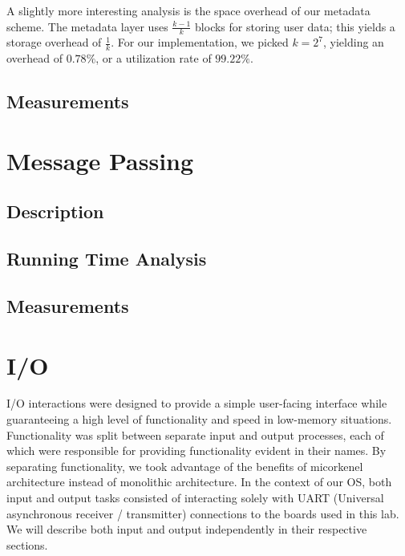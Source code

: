 \documentclass[12pt]{report}
\begin{document}
    A slightly more interesting analysis is the space overhead of our metadata
    scheme. The metadata layer uses $\frac{k-1}{k}$ blocks for storing user
    data; this yields a storage overhead of $\frac{1}{k}$. For our
    implementation, we picked $k=2^7$, yielding an overhead of $0.78\%$, or a
    utilization rate of $99.22\%$.

\section{Measurements}

\chapter{Message Passing}

\section{Description}

\section{Running Time Analysis}

\section{Measurements}

\chapter{I/O}

    I/O interactions were designed to provide a simple user-facing interface
    while guaranteeing a high level of functionality and speed in low-memory
    situations. Functionality was split between separate input and output
    processes, each of which were responsible for providing functionality
    evident in their names. By separating functionality, we took advantage of
    the benefits of micorkenel architecture instead of monolithic architecture.
    In the context of our OS, both input and output tasks consisted of %
    interacting solely with UART (Universal asynchronous receiver / transmitter)
    connections to the boards used in this lab. %
    We will describe both input and output independently in their respective
    sections.
\end{document}
